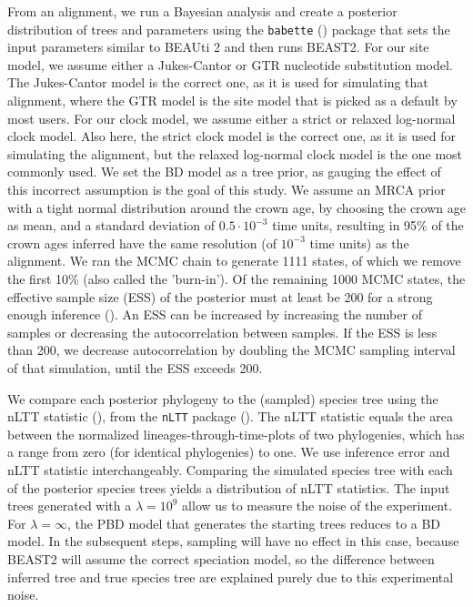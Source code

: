 From an alignment, we run a Bayesian analysis and 
create a posterior distribution of trees and parameters
using the \verb;babette; (\cite{babette}) package
that sets the input parameters similar to BEAUti 2 and then runs BEAST2. 
For our site model, we assume either a Jukes-Cantor or GTR nucleotide substitution model.
The Jukes-Cantor model is the correct one, as it is used for simulating that alignment,
where the GTR model is the site model that is picked as a default by most users.
For our clock model, we assume either a strict or relaxed log-normal 
clock model. 
Also here, the strict clock model is the correct one, as it is used for simulating the alignment,
but the relaxed log-normal clock model is the one most commonly used.
We set the BD model as a tree prior, 
as gauging the effect of this incorrect assumption is the goal of this study. 
We assume an MRCA prior with a tight normal distribution
around the crown age, by choosing the crown age as mean, and a standard deviation 
of $0.5 \cdot 10^{-3}$ time units,
resulting in 95\% of the crown ages inferred have the same resolution (of $10^{-3}$ time 
units) as the alignment. 
We ran the MCMC chain to generate 1111 states,
of which we remove the first 10\% (also called the 'burn-in'). 
Of the remaining
1000 MCMC states, the effective sample size (ESS) of the posterior 
must at least be 200
for a strong enough inference (\cite{beastbook}). An ESS can be increased by increasing
the number of samples or decreasing the autocorrelation between samples. 
If the ESS is less than 200, we decrease autocorrelation by doubling 
the MCMC sampling interval of that simulation, until the ESS exceeds 200.

We compare each posterior phylogeny to the (sampled) species tree
using the nLTT statistic (\cite{janzen2015}), from the \verb;nLTT; package (\cite{nltt}). 
The nLTT statistic equals the area between the normalized
lineages-through-time-plots of two phylogenies, which has a range 
from zero (for identical phylogenies) to one. We use inference error 
and nLTT statistic interchangeably. Comparing the simulated species tree
with each of the posterior species trees yields a distribution of nLTT statistics. 
The input trees generated with a $\lambda = 10^9$ allow us to measure the noise of the experiment.
For $\lambda = \infty$, the PBD model that generates the starting trees reduces to a BD model.
In the subsequent steps, sampling will have no effect in this case, because BEAST2 will assume the correct speciation model,
so the difference between inferred tree and true species tree are explained purely due to this experimental noise.

